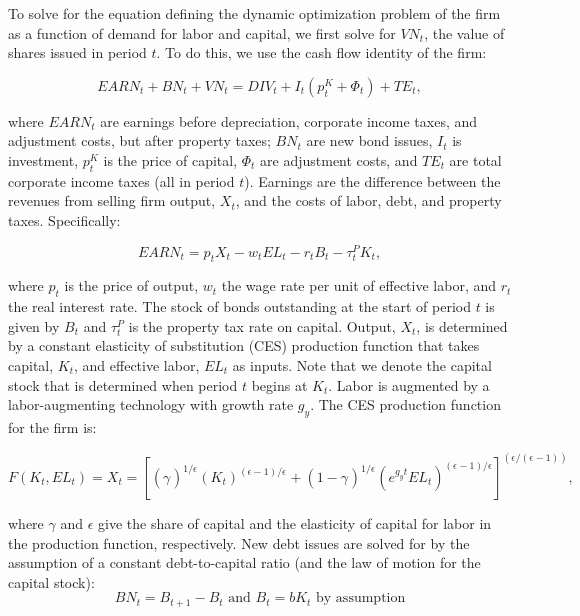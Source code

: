 To solve for the equation defining the dynamic optimization problem of the firm as a function of demand for labor and capital, we first solve for $VN_{t}$, the value of shares issued in period $t$.  To do this, we use the cash flow identity of the firm: 

\begin{equation}
\label{eqn:vn}
EARN_{t}+BN_{t}+VN_{t}=DIV_{t}+I_{t}(p^{K}_{t}+\Phi_{t})+TE_{t}, 
\end{equation}

\noindent\noindent where $EARN_{t}$ are earnings before depreciation, corporate income taxes, and adjustment costs, but after property taxes; $BN_{t}$ are new bond issues, $I_{t}$ is investment, $p^{K}_{t}$ is the price of capital, $\Phi_{t}$ are adjustment costs, and $TE_{t}$ are total corporate income taxes (all in period $t$).  Earnings are the difference between the revenues from selling firm output, $X_{t}$, and the costs of labor, debt, and property taxes.  Specifically:    

\begin{equation}
\label{eqn:earn}
EARN_{t}=p_{t}X_{t}-w_{t}EL_{t}-r_{t}B_{t}-\tau^{P}_{t}K_{t},
\end{equation}

\noindent\noindent where $p_{t}$ is the price of output, $w_{t}$ the wage rate per unit of effective labor, and $r_{t}$ the real interest rate.  The stock of bonds outstanding at the start of period $t$ is given by $B_{t}$ and $\tau^{P}_{t}$ is the property tax rate on capital.  Output, $X_{t}$, is determined by a constant elasticity of substitution (CES) production function that takes capital, $K_{t}$, and effective labor, $EL_{t}$ as inputs. Note that we denote the capital stock that is determined when period $t$ begins at $K_{t}$.  Labor is augmented by a labor-augmenting technology with growth rate $g_{y}$.  The CES production function for the firm is:

\begin{equation}
\label{eqn:prod_fun}
F(K_{t},EL_{t})=X_{t} = \left[(\gamma_{})^{1/\epsilon_{}}(K_{t})^{(\epsilon-1)/\epsilon_{}}+(1-\gamma_{})^{1/\epsilon_{}}(e^{g_{y}t}EL_{t})^{(\epsilon_{}-1)/\epsilon_{}}\right]^{(\epsilon_{}/(\epsilon_{}-1))},
\end{equation}

\noindent\noindent where $\gamma$ and $\epsilon$ give the share of capital and the elasticity of capital for labor in the production function, respectively.  New debt issues are solved for by the assumption of a constant debt-to-capital ratio (and the law of motion for the capital stock):
\begin{equation}
\label{eqn:debt}
BN_{t}=B_{t+1} - B_{t} \text{ and } B_{t}=bK_{t} \text{ by assumption} 
\end{equation}

